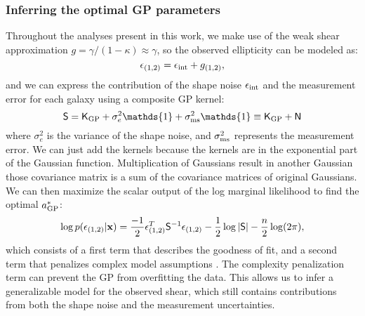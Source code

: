 \subsubsection{Inferring the optimal GP parameters}
Throughout the analyses present in this work, 
we make use of the weak shear approximation 
$g = \gamma / (1 - \kappa)  \approx \gamma$, so the observed ellipticity can be
modeled as: 
\begin{equation}
	\epsilon_{(1, 2)} = \epsilon_{\rm int} + g_{(1, 2)}, 
	\label{eq:weak_shear_approx}
\end{equation}
and we can express the contribution of the shape noise $\epsilon_{\rm int}$
and the measurement error
for each galaxy using a composite GP kernel:
\begin{equation}
	\mathsf{S} = \kerngp_{\rm GP} + \sigma_e^2 \mathds{1}  + \sigma_{\rm ms}^2
	\mathds{1}
	\equiv \kerngp_{\rm GP} + \mathsf{N}
	\label{eq:composite_kernel}
\end{equation}
where $\sigma_e^2$ is the variance of the shape noise, and $\sigma_{\rm ms}^2$
represents the measurement error. We can just add the kernels because the
kernels are in the exponential part of the Gaussian function.
Multiplication of Gaussians result in another Gaussian those covariance matrix
is a sum of the covariance matrices of original Gaussians. 
We can then maximize the scalar output of the log marginal likelihood to find the optimal 
$a_{\rm GP}^*$: 
\begin{equation}
	\log p(\epsilon_{(1,2)} | \mathbf{x}) = \frac{-1}{2}\epsilon_{(1,2)}^T \mathsf{S}^{-1}
\epsilon_{(1, 2)}
- \frac{1}{2}\log|\mathsf{S}| - \frac{n}{2}\log(2\pi),
\label{eq:log_marginal_likelihood}
\end{equation}
which consists of a first term that describes the goodness of fit,
and a second term that penalizes complex model assumptions \citep{Rasmussen2006}. 
The complexity penalization term can prevent the GP from overfitting the data.
This allows us to infer a generalizable model for the observed shear, which still
contains contributions from both the shape noise and the measurement
uncertainties. 

